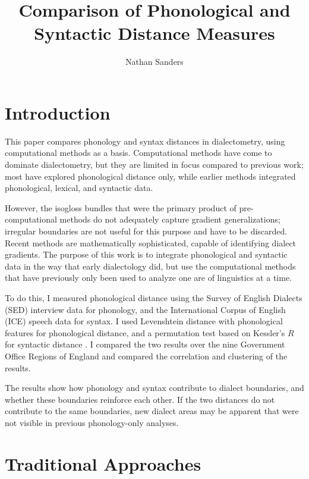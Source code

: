 \documentclass[11pt]{article}
\title{Comparison of Phonological and Syntactic Distance Measures}
\author{Nathan Sanders}
\begin{document}
\maketitle
\doublespacing
\section{Introduction}
This paper compares phonology and syntax distances in dialectometry,
using computational methods as a basis. Computational methods have
come to dominate dialectometry, but they are limited in focus compared
to previous work; most have explored phonological distance only, while
earlier methods integrated phonological, lexical, and syntactic data.

However, the isogloss bundles that were the primary product of
pre-computational methods do not adequately capture gradient
generalizations; irregular boundaries are not useful for this purpose
and have to be discarded. Recent methods are mathematically
sophisticated, capable of identifying dialect gradients. The purpose
of this work is to integrate phonological and syntactic data in the
way that early dialectology did, but use the computational methods
that have previously only been used to analyze one are of linguistics
at a time.

To do this, I measured phonological distance using the Survey of
English Dialects (SED) \cite{orton63} interview data for phonology,
and the International Corpus of English (ICE) \cite{nelson02} speech
data for syntax. I used Levenshtein distance \cite{lev65} with
phonological features \cite{nerbonne97} for phonological distance, and
a permutation test based on Kessler's $R$ \cite{kessler01} for
syntactic distance \cite{nerbonne06}. I compared the two results over
the nine Government Office Regions of England and compared the
correlation and clustering of the results.

The results show how phonology and syntax contribute to dialect
boundaries, and whether these boundaries reinforce each other. If the
two distances do not contribute to the same boundaries, new dialect
areas may be apparent that were not visible in previous phonology-only
analyses.

\section{Traditional Approaches}
\end{document}
